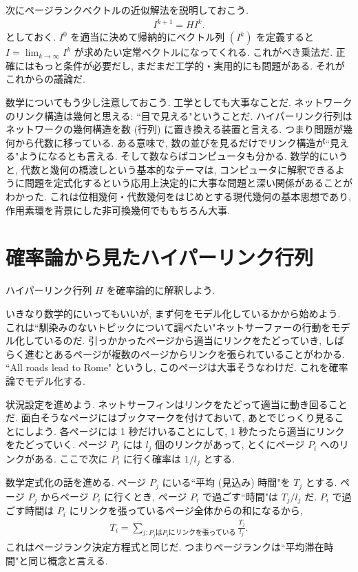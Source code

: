 \documentclass[openany, a4paper, oneside]{jsbook}
\begin{document}
次にページランクベクトルの近似解法を説明しておこう.
\begin{align}
 I^{k+1}
 =
 H I^k. \label{linear-algebra-google-pagerank9}
\end{align}
としておく.
$I^0$ を適当に決めて帰納的にベクトル列 $(I^k)$ を定義すると
$I=\lim_{k \to \infty} I^k$ が求めたい定常ベクトルになってくれる.
これがべき乗法だ.
正確にはもっと条件が必要だし, まだまだ工学的・実用的にも問題がある.
それがこれからの議論だ.

\begin{rem}
数学についてもう少し注意しておこう.
工学としても大事なことだ.
ネットワークのリンク構造は幾何と思える: ``目で見える"ということだ.
ハイパーリンク行列はネットワークの幾何構造を数 (行列) に置き換える装置と言える.
つまり問題が幾何から代数に移っている.
ある意味で, 数の並びを見るだけでリンク構造が``見える"ようになるとも言える.
そして数ならばコンピュータも分かる.
数学的にいうと, 代数と幾何の橋渡しという基本的なテーマは,
コンピュータに解釈できるように問題を定式化するという応用上決定的に大事な問題と深い関係があることがわかった.
これは位相幾何・代数幾何をはじめとする現代幾何の基本思想であり,
作用素環を背景にした非可換幾何でももちろん大事.
\end{rem}
\section{確率論から見たハイパーリンク行列}

ハイパーリンク行列 $H$ を確率論的に解釈しよう.

いきなり数学的にいってもいいが, まず何をモデル化しているかから始めよう.
これは``馴染みのないトピックについて調べたい"ネットサーファーの行動をモデル化しているのだ.
引っかかったページから適当にリンクをたどっていき,
しばらく進むとあるページが複数のページからリンクを張られていることがわかる.
``All roads lead to Rome" というし, このページは大事そうなわけだ.
これを確率論でモデル化する.

状況設定を進めよう.
ネットサーフィンはリンクをたどって適当に動き回ることだ.
面白そうなページにはブックマークを付けておいて, あとでじっくり見ることにしよう.
各ページには 1 秒だけいることにして, 1 秒たったら適当にリンクをたどっていく.
ページ $P_j$ には $l_j$ 個のリンクがあって, とくにページ $P_i$ へのリンクがある.
ここで次に $P_i$ に行く確率は $1/l_j$ とする.

数学定式化の話を進める.
ページ $P_j$ にいる``平均 (見込み) 時間"を $T_j$ とする.
ページ $P_j$ からページ $P_i$ に行くとき, ページ $P_i$ で過ごす``時間"は $T_j/l_j$ だ.
$P_i$ で過ごす時間は $P_i$ にリンクを張っているページ全体からの和になるから,
\begin{align}
 T_i
 =
 \sum_{j:P_j \text{は} P_i \text{にリンクを張っている} } \frac{ T_j }{ l_j }.
\end{align}
これはページランク決定方程式と同じだ.
つまりページランクは``平均滞在時間"と同じ概念と言える.
\end{document}
